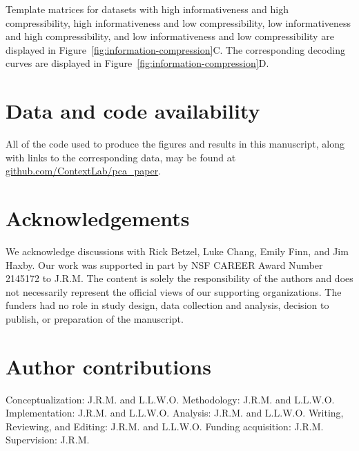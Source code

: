 \documentclass[english, 11pt]{article}
\begin{document}
Template matrices for datasets with high informativeness and high
compressibility, high informativeness and low compressibility, low
informativeness and high compressibility, and low informativeness and low
compressibility are displayed in Figure~\ref{fig:information-compression}C. The
corresponding decoding curves are displayed in
Figure~\ref{fig:information-compression}D.



\section*{Data and code availability}

All of the code used to produce the figures and results in this manuscript,
along with links to the corresponding data, may be found at
\href{https://github.com/ContextLab/pca_paper}{github.com/ContextLab/pca\_paper}.

\section*{Acknowledgements} 

We acknowledge discussions with Rick Betzel, Luke Chang, Emily Finn, and Jim
Haxby. Our work was supported in part by NSF CAREER Award Number 2145172 to
J.R.M. The content is solely the responsibility of the authors and does not
necessarily represent the official views of our supporting organizations. The
funders had no role in study design, data collection and analysis, decision to
publish, or preparation of the manuscript.


\section*{Author contributions} 

Conceptualization: J.R.M. and L.L.W.O. Methodology: J.R.M. and L.L.W.O.
Implementation: J.R.M. and L.L.W.O. Analysis: J.R.M. and L.L.W.O. Writing,
Reviewing, and Editing: J.R.M. and L.L.W.O. Funding acquisition: J.R.M.
Supervision: J.R.M.



\end{document}
